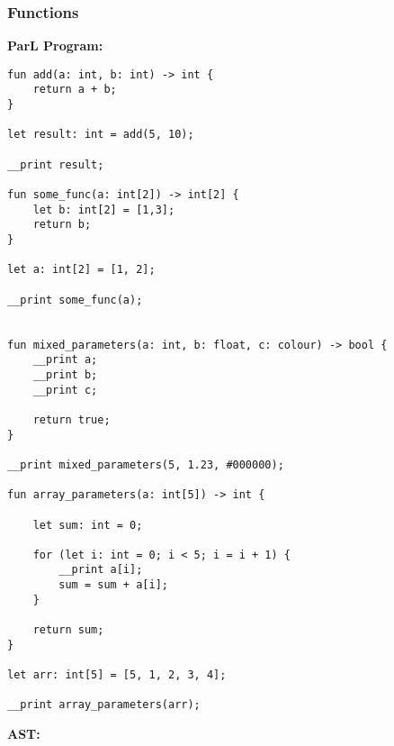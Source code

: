 \newpage

\subsubsection*{Functions}

\textbf{ParL Program:}
{
  \lstset{xleftmargin=0.2\textwidth}

  \begin{lstlisting}
fun add(a: int, b: int) -> int {
    return a + b;
}

let result: int = add(5, 10);

__print result;

fun some_func(a: int[2]) -> int[2] {
    let b: int[2] = [1,3];
    return b;
}

let a: int[2] = [1, 2];

__print some_func(a);


fun mixed_parameters(a: int, b: float, c: colour) -> bool {
    __print a;
    __print b;
    __print c;

    return true;
}

__print mixed_parameters(5, 1.23, #000000);

fun array_parameters(a: int[5]) -> int {

    let sum: int = 0;

    for (let i: int = 0; i < 5; i = i + 1) {
        __print a[i];
        sum = sum + a[i];
    }

    return sum;
}

let arr: int[5] = [5, 1, 2, 3, 4];

__print array_parameters(arr);

\end{lstlisting}
}

\newpage

\textbf{AST:}

